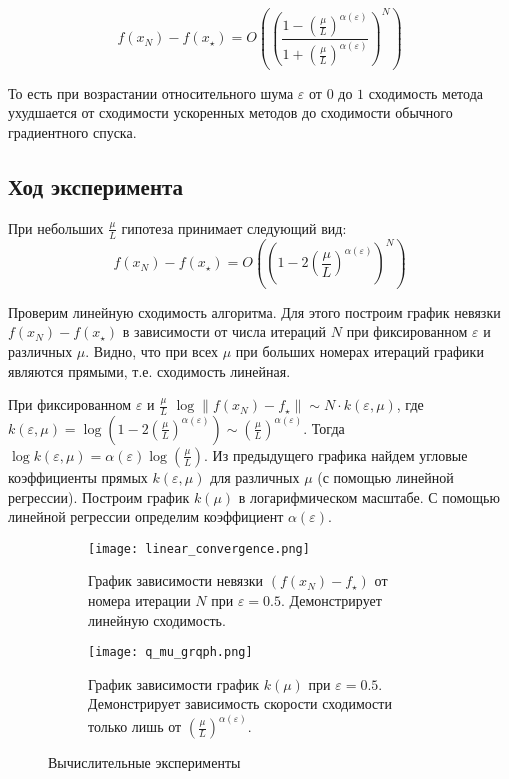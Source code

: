 \documentclass{article}
\begin{document}
\begin{equation}\label{NoisyGFOMconverge}
   f(x_N) - f(x_{\star}) = O\left(\left(\frac{1 - \left(\frac{\mu}{L}\right)^{\alpha(\varepsilon)}}{1 + \left(\frac{\mu}{L}\right)^{\alpha(\varepsilon)}}\right)^N\right) 
\end{equation}

То есть при возрастании относительного шума $\varepsilon$ от $0$ до $1$ сходимость метода ухудшается от сходимости ускоренных методов до сходимости обычного градиентного спуска.

\subsection{Ход эксперимента}

При небольших $\frac{\mu}{L}$ гипотеза принимает следующий вид:
\begin{equation}\label{NoisyGFOMconverge}
   f(x_N) - f(x_{\star}) = O\left(\left(1 - 2\left(\frac{\mu}{L}\right)^{\alpha(\varepsilon)}\right)^N\right) 
\end{equation}

Проверим линейную сходимость алгоритма. Для этого построим график невязки $f(x_N) - f(x_{\star})$ в зависимости от числа итераций $N$ при фиксированном $\varepsilon$ и различных $\mu$. Видно, что при всех $\mu$ при больших номерах итераций графики являются прямыми, т.е. сходимость линейная.

При фиксированном $\varepsilon$ и $\frac{\mu}{L}$ $\log{\|f(x_N) - f_{\star}\| \sim N \cdot k(\varepsilon, \mu)}$, где $k(\varepsilon, \mu) = \log{\left(1 - 2\left(\frac{\mu}{L}\right)^{\alpha(\varepsilon)}\right)}\sim \left(\frac{\mu}{L}\right)^{\alpha(\varepsilon)}$.
Тогда $\log{k(\varepsilon, \mu)} = \alpha(\varepsilon) \log{\left(\frac{\mu}{L}\right)}$. Из предыдущего графика найдем угловые коэффициенты прямых $k(\varepsilon, \mu)$ для различных $\mu$ (с помощью линейной регрессии). Построим график $k(\mu)$ в логарифмическом масштабе. С помощью линейной регрессии определим коэффициент $\alpha(\varepsilon)$. 
\begin{figure}[htp]
     \centering
     \begin{subfigure}[b]{0.45\textwidth}
         \centering
         \texttt{[image: linear\_convergence.png]}
         \caption{График зависимости невязки $(f(x_N) - f_{\star})$ от номера итерации $N$ при $\varepsilon = 0.5$. Демонстрирует линейную сходимость.}
         \label{fig:linear_conv}
     \end{subfigure}
     \hfill
     \begin{subfigure}[b]{0.45\textwidth}
         \centering
         \texttt{[image: q\_mu\_grqph.png]}
         \caption{График зависимости график $k(\mu)$ при $\varepsilon = 0.5$. Демонстрирует зависимость скорости сходимости только лишь от $\left(\frac{\mu}{L}\right)^{\alpha(\varepsilon)}$.}
         \label{fig:three sin x}
     \end{subfigure}
     \hfill
        \caption{Вычислительные эксперименты}
        \label{fig:two graphs}
\end{figure}
\end{document}
